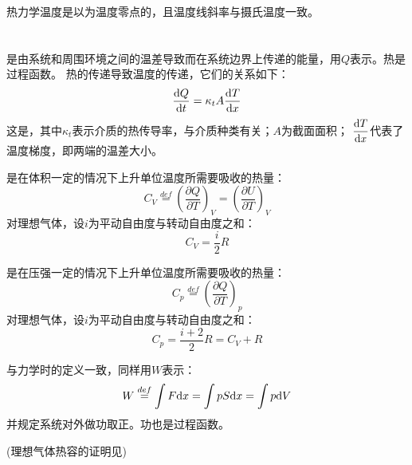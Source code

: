             热力学温度是以为温度零点的，且温度线斜率与摄氏温度一致。
    \section[热力学第一定律]{}
        \subsection[热与功]{}
            \begin{Itemize}
                \item {}是由系统和周围环境之间的温差导致而在系统边界上传递的能量，用$Q$表示。热是过程函数。
                热的传递导致温度的传递，它们的关系如下：
                \begin{equation}
                    \frac{\mathrm{d}{Q}}{\mathrm{d}{t}} = \kappa_{t}A\frac{\mathrm{d}{T}}{\mathrm{d}{x}}
                \end{equation}
                这是，其中$\kappa_{t}$表示介质的热传导率，与介质种类有关；$A$为截面面积；
                $\dfrac{\mathrm{d}{T}}{\mathrm{d}{x}}$代表了温度梯度，即两端的温差大小。
                \item {}是在体积一定的情况下上升单位温度所需要吸收的热量：
                \begin{equation}
                    C_{V} \overset{def}{=} \left(\frac{\partial{Q}}{\partial{T}}\right)_{V} = \left(\frac{\partial{U}}{\partial{T}}\right)_{V}
                    \nonumber
                \end{equation}
                对理想气体，设$i$为平动自由度与转动自由度之和：
                \begin{equation}
                    C_{V} = \frac{i}{2}R
                    \nonumber
                \end{equation}
                \item {}是在压强一定的情况下上升单位温度所需要吸收的热量：
                \begin{equation}
                    C_{p} \overset{def}{=} \left(\frac{\partial{Q}}{\partial{T}}\right)_{p} %
                    \nonumber
                \end{equation}
                对理想气体，设$i$为平动自由度与转动自由度之和：
                \begin{equation}
                    C_{p} = \frac{i+2}{2}R = C_{V}+R
                    \nonumber
                \end{equation}
                \item {}与力学时的定义一致，同样用$W$表示：
                \begin{equation}
                    W \overset{def}{=} \int F\mathrm{d}{x} = \int pS\mathrm{d}{x} = \int p\mathrm{d}{V}
                    \nonumber
                \end{equation}
                并规定系统对外做功取正。功也是过程函数。                
            \end{Itemize}
            (理想气体热容的证明见)

